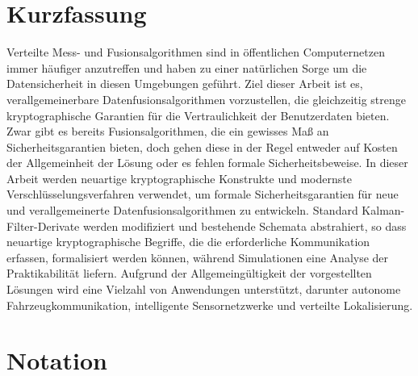 \documentclass[oneside]{scrbook}
\theoremstyle{definition}
\theoremstyle{definition}
\theoremstyle{remark}
\begin{document}
\chapter{Kurzfassung}
Verteilte Mess- und Fusionsalgorithmen sind in öffentlichen Computernetzen immer häufiger anzutreffen und haben zu einer natürlichen Sorge um die Datensicherheit in diesen Umgebungen geführt. Ziel dieser Arbeit ist es, verallgemeinerbare Datenfusionsalgorithmen vorzustellen, die gleichzeitig strenge kryptographische Garantien für die Vertraulichkeit der Benutzerdaten bieten. Zwar gibt es bereits Fusionsalgorithmen, die ein gewisses Maß an Sicherheitsgarantien bieten, doch gehen diese in der Regel entweder auf Kosten der Allgemeinheit der Lösung oder es fehlen formale Sicherheitsbeweise. In dieser Arbeit werden neuartige kryptographische Konstrukte und modernste Verschlüsselungsverfahren verwendet, um formale Sicherheitsgarantien für neue und verallgemeinerte Datenfusionsalgorithmen zu entwickeln. Standard Kalman-Filter-Derivate werden modifiziert und bestehende Schemata abstrahiert, so dass neuartige kryptographische Begriffe, die die erforderliche Kommunikation erfassen, formalisiert werden können, während Simulationen eine Analyse der Praktikabilität liefern. Aufgrund der Allgemeingültigkeit der vorgestellten Lösungen wird eine Vielzahl von Anwendungen unterstützt, darunter autonome Fahrzeugkommunikation, intelligente Sensornetzwerke und verteilte Lokalisierung.

% 
%                                                                                         
%                                                                                         
%                                                                                         
% 

\chapter{Notation}
\end{document}
